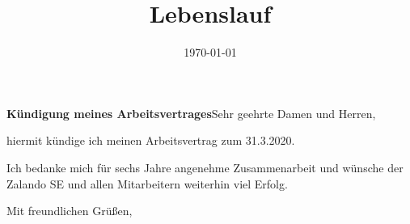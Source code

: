 \documentclass[11pt,a4paper,sans]{moderncv} %
\title{Lebenslauf}
\begin{document}


\clearpage

\date{\today} %
\opening{\textbf{Kündigung meines Arbeitsvertrages}\newline{}\newline{}Sehr geehrte Damen und Herren,} %
\closing{} %

\makelettertitle %

hiermit kündige ich meinen Arbeitsvertrag zum 31.3.2020.
 
Ich bedanke mich für sechs Jahre angenehme Zusammenarbeit und wünsche der Zalando SE und allen Mitarbeitern weiterhin viel Erfolg.

Mit freundlichen Grüßen,\\[1.5em]

\end{document}
